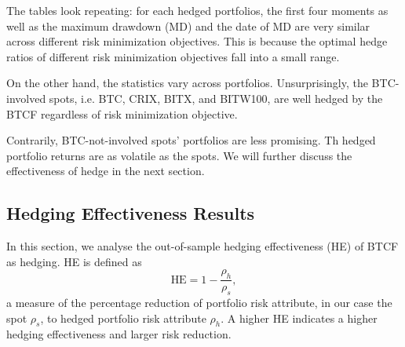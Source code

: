The tables look repeating: for each hedged portfolios,
the first four moments as well as the maximum drawdown (MD) and the date of MD are very similar across different risk minimization objectives.
This is because the optimal hedge ratios of different risk minimization objectives fall into a small range. \medskip

On the other hand, the statistics vary across portfolios.
Unsurprisingly, the BTC-involved spots, i.e. BTC, CRIX, BITX, and BITW100, are well hedged by the BTCF regardless of risk minimization objective. \medskip

Contrarily, BTC-not-involved spots' portfolios are less promising.
Th hedged portfolio returns are as volatile as the spots.
We will further discuss the effectiveness of hedge in the next section. %

%
%
%
%
%
%



\subsection{Hedging Effectiveness Results}\label{sec: HE results}
In this section, we analyse the out-of-sample hedging effectiveness (HE) of BTCF as hedging.
HE is defined as $$\text{HE} = 1-\frac{\rho_h}{\rho_s},$$
a measure of the percentage reduction of portfolio risk attribute, in our case the spot $\rho_s$,
to hedged portfolio risk attribute $\rho_h$.
A higher HE indicates a higher hedging effectiveness and larger risk reduction. \medskip

